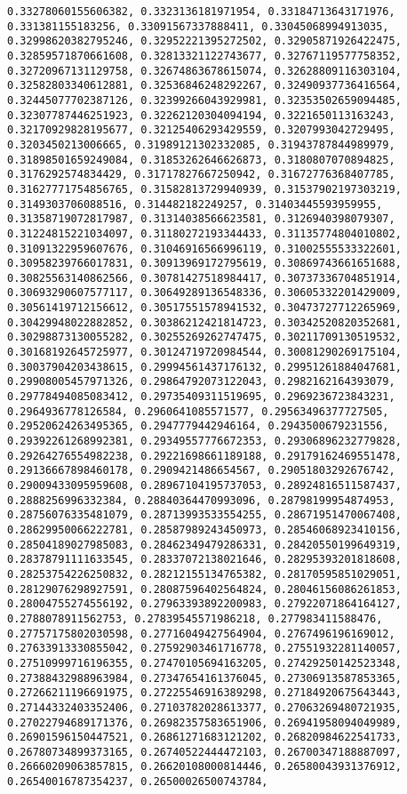 \documentclass[11pt]{article}
\begin{document}
\begin{Verbatim}[commandchars=\\\{\}]
0.33278060155606382, 0.3323136181971954, 0.33184713643171976, 0.331381155183256, 0.33091567337888411, 0.33045068994913035, 0.32998620382795246, 0.32952221395272502, 0.32905871926422475, 0.32859571870661608, 0.32813321122743677, 0.32767119577758352, 0.32720967131129758, 0.32674863678615074, 0.32628809116303104, 0.32582803340612881, 0.32536846248292267, 0.32490937736416564, 0.32445077702387126, 0.32399266043929981, 0.32353502659094485, 0.32307787446251923, 0.32262120304094194, 0.3221650113163243, 0.32170929828195677, 0.32125406293429559, 0.3207993042729495, 0.3203450213006665, 0.31989121302332085, 0.31943787844989979, 0.31898501659249084, 0.31853262646626873, 0.3180807070894825, 0.3176292574834429, 0.31717827667250942, 0.31672776368407785, 0.31627771754856765, 0.31582813729940939, 0.31537902197303219, 0.3149303706088516, 0.314482182249257, 0.31403445593959955, 0.31358719072817987, 0.31314038566623581, 0.3126940398079307, 0.31224815221034097, 0.31180272193344433, 0.31135774804010802, 0.31091322959607676, 0.31046916566996119, 0.31002555533322601, 0.30958239766017831, 0.30913969172795619, 0.30869743661651688, 0.30825563140862566, 0.30781427518984417, 0.30737336704851914, 0.30693290607577117, 0.30649289136548336, 0.30605332201429009, 0.30561419712156612, 0.30517551578941532, 0.30473727712265969, 0.30429948022882852, 0.30386212421814723, 0.30342520820352681, 0.30298873130055282, 0.30255269262747475, 0.30211709130519532, 0.30168192645725977, 0.30124719720984544, 0.30081290269175104, 0.30037904203438615, 0.29994561437176132, 0.29951261884047681, 0.29908005457971326, 0.29864792073122043, 0.2982162164393079, 0.29778494085083412, 0.29735409311519695, 0.2969236723843231, 0.2964936778126584, 0.2960641085571577, 0.29563496377727505, 0.29520624263495365, 0.2947779442946164, 0.2943500679231556, 0.29392261268992381, 0.29349557776672353, 0.29306896232779828, 0.29264276554982238, 0.29221698661189188, 0.29179162469551478, 0.29136667898460178, 0.2909421486654567, 0.29051803292676742, 0.29009433095959608, 0.28967104195737053, 0.28924816511587437, 0.2888256996332384, 0.28840364470993096, 0.28798199954874953, 0.28756076335481079, 0.28713993533554255, 0.28671951470067408, 0.28629950066222781, 0.28587989243450973, 0.28546068923410156, 0.28504189027985083, 0.28462349479286331, 0.28420550199649319, 0.28378791111633545, 0.28337072138021646, 0.28295393201818608, 0.28253754226250832, 0.28212155134765382, 0.28170595851029051, 0.28129076298927591, 0.28087596402564824, 0.28046156086261853, 0.28004755274556192, 0.27963393892200983, 0.27922071864164127, 0.2788078911562753, 0.27839545571986218, 0.277983411588476, 0.27757175802030598, 0.27716049427564904, 0.2767496196169012, 0.27633913330855042, 0.27592903461716778, 0.27551932281140057, 0.27510999716196355, 0.27470105694163205, 0.27429250142523348, 0.27388432988963984, 0.27347654161376045, 0.27306913587853365, 0.27266211196691975, 0.27225546916389298, 0.27184920675643443, 0.27144332403352406, 0.27103782028613377, 0.27063269480721935, 0.27022794689171376, 0.26982357583651906, 0.26941958094049989, 0.26901596150447521, 0.26861271683121202, 0.26820984622541733, 0.26780734899373165, 0.26740522444472103, 0.26700347188887097, 0.26660209063857815, 0.26620108000814446, 0.26580043931376912, 0.26540016787354237, 0.26500026500743784, 
\end{Verbatim}
\end{document}
